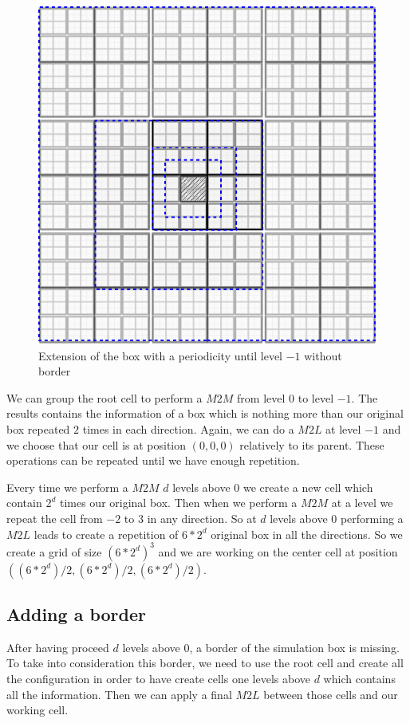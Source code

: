\documentclass[12pt]{article} %
\begin{document}
\begin{figure}[h]
\centering
\includegraphics[scale=0.45]{Images/PeriodicL-1}
\caption{Extension of the box with a periodicity until level $-1$ without border}
\end{figure}

We can group the root cell to perform a $M2M$ from level $0$ to level $-1$.
The results contains the information of a box which is nothing more than our original box repeated $2$ times in each direction.
Again, we can do a $M2L$ at level $-1$ and we choose that our cell is at position $(0,0,0)$ relatively to its parent.
These operations can be repeated until we have enough repetition.

Every time we perform a $M2M$ $d$ levels above $0$ we create a new cell which contain $2^d$ times our original box.
Then when we perform a $M2M$ at a level we repeat the cell from $-2$ to $3$ in any direction.
So at $d$ levels above $0$ performing a $M2L$ leads to create a repetition of $6*2^d$ original box in all the directions.
So we create a grid of size $(6*2^d)^3$ and we are working on the center cell at position $((6*2^d)/2,(6*2^d)/2,(6*2^d)/2)$.


\subsection{Adding a border}
After having proceed $d$ levels above $0$, a border of the simulation box is missing.
To take into consideration this border, we need to use the root cell and create all the configuration in order to have create
cells one levels above $d$ which contains all the information.
Then we can apply a final $M2L$ between those cells and our working cell.
\end{document}
